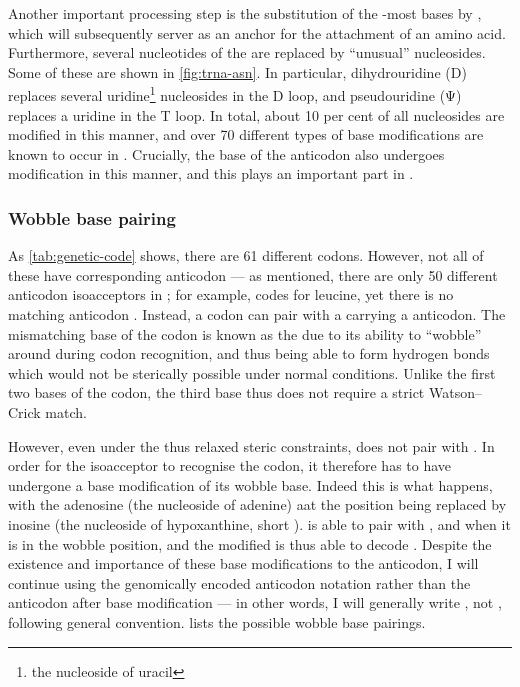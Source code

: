 Another important processing step is the substitution of the \threep-most bases
by , which will subsequently server as an anchor for the
attachment of an amino acid. Furthermore, several nucleotides of the \trna are
replaced by “unusual” nucleosides. Some of these are shown in
\cref{fig:trna-asn}. In particular, dihydrouridine (\seq D) replaces several
uridine\footnote{the nucleoside of uracil} nucleosides in the D loop, and
pseudouridine (\seq Ψ) replaces a uridine in the T loop. In total, about
\num{10} per cent of all nucleosides are modified in this manner, and over
\num{70} different types of base modifications are known to occur in \trna
\citep{Limbach:1994,Dalluge:1997,Alberts:2002}. Crucially, the \fivep base of
the anticodon also undergoes modification in this manner, and this plays an
important part in .

\subsubsection{Wobble base pairing}

As \cref{tab:genetic-code} shows, there are \num{61} different codons. However,
not all of these have corresponding anticodon \trna[s] --- as mentioned, there
are only \num{50} different anticodon isoacceptors in \mmu; for example,
 codes for leucine, yet there is no matching 
anticodon \trna. Instead, a  codon can pair with a \trna carrying a
 anticodon. The mismatching \threep base of the codon is known as
the  due to its ability to “wobble” around during codon
recognition, and thus being able to form hydrogen bonds which would not be
sterically possible under normal conditions. Unlike the first two bases of the
codon, the third base thus does not require a strict Watson--Crick match.

However, even under the thus relaxed steric constraints, \nA does not pair with
\nC. In order for the  isoacceptor \trna[s] to recognise the
 codon, it therefore has to have undergone a base modification of its
wobble base. Indeed this is what happens, with the adenosine (the nucleoside of
adenine) aat the \fivep position being replaced by inosine (the nucleoside of
hypoxanthine, short \nI). \nI is able to pair with \nA, \nC and \nU when it is
in the wobble position, and the modified  is thus able to decode
 \citep{Crick:1966,Murphy:2004}. Despite the existence and importance
of these base modifications to the anticodon, I will continue using the
genomically encoded anticodon notation rather than the anticodon after base
modification --- in other words, I will generally write , not
, following general convention.  lists the
possible wobble base pairings.


